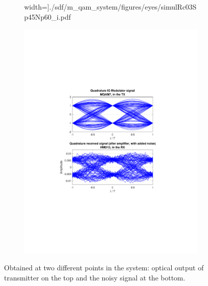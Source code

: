 \begin{refsection}
\begin{figure}[H]
\begin{minipage}{\linewidth}
\begin{subfigure}{.45\textwidth}
		width=\textwidth]{./sdf/m_qam_system/figures/eyes/simulRc03Sp45Np60_i.pdf}
	\end{subfigure}
	\begin{subfigure}{.45\textwidth}
		\centering
		\includegraphics[clip, trim=4cm 7cm 4cm 7cm, 
		width=\textwidth]{./sdf/m_qam_system/figures/eyes/simulRc03Sp45Np60_q.pdf}
	\end{subfigure}
	
	\caption{
		Obtained
		at two different points in the system: optical output of transmitter on the top and
		the noisy signal at the bottom.
		\label{fig:eyes_n_rc_45_03}}
	\end{minipage}
\end{figure}
\begin{table}[H]
	\centering
	

\end{table}
\end{refsection}
